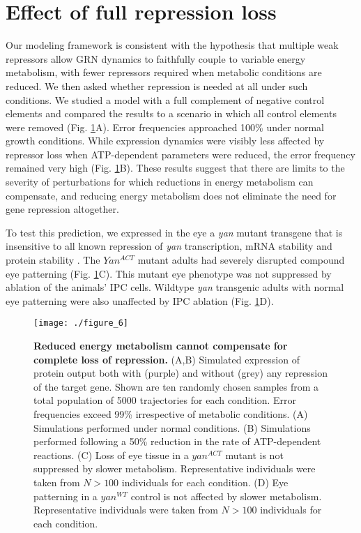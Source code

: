 \section{Effect of full repression loss}

Our modeling framework is consistent with the hypothesis that multiple weak repressors allow GRN dynamics to faithfully couple to variable energy metabolism, with fewer repressors required when metabolic conditions are reduced. We then asked whether repression is needed at all under such conditions. We studied a model with a full complement of negative control elements and compared the results to a scenario in which all control elements were removed (Fig. \ref{fig:metabolism:fig6}A). Error frequencies approached 100\% under normal growth conditions. While expression dynamics were visibly less affected by repressor loss when ATP-dependent parameters were reduced, the error frequency remained very high (Fig. \ref{fig:metabolism:fig6}B). These results suggest that there are limits to the severity of perturbations for which reductions in energy metabolism can compensate, and reducing energy metabolism does not eliminate the need for gene repression altogether.

To test this prediction, we expressed in the eye a \textit{yan} mutant transgene that is insensitive to all known repression of \textit{yan} transcription, mRNA stability and protein stability \cite{Rebay1995}. The $Yan^{ACT}$ mutant adults had severely disrupted compound eye patterning (Fig. \ref{fig:metabolism:fig6}C). This mutant eye phenotype was not suppressed by ablation of the animals' IPC cells. Wildtype \textit{yan} transgenic adults with normal eye patterning were also unaffected by IPC ablation (Fig. \ref{fig:metabolism:fig6}D).

\begin{figure}[h!]
\centering
\texttt{[image: ./figure\_6]}
\caption[Reduced energy metabolism cannot compensate for complete loss of repression.]{\textbf{Reduced energy metabolism cannot compensate for complete loss of repression.} (A,B) Simulated expression of protein output both with (purple) and without (grey) any repression of the target gene. Shown are ten randomly chosen samples from a total population of 5000 trajectories for each condition. Error frequencies exceed 99\% irrespective of metabolic conditions. (A) Simulations performed under normal conditions. (B) Simulations performed following a 50\% reduction in the rate of ATP-dependent reactions. (C) Loss of eye tissue in a $yan^{ACT}$ mutant is not suppressed by slower metabolism. Representative individuals were taken from $N>100$ individuals for each condition. (D) Eye patterning in a $yan^{WT}$ control is not affected by slower metabolism. Representative individuals were taken from $N>100$ individuals for each condition.}
\label{fig:metabolism:fig6}
\end{figure}


